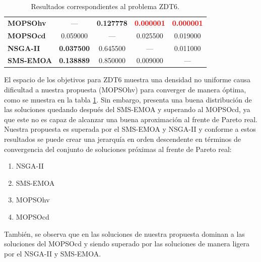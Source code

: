 \begin{table}
\begin{center}
\begin{tabular}{|l|cc|cc|}
	\textbf{MOPSOhv} &---       & \textbf{0.127778} & \textbf{\textcolor{red}{0.000001}}  & \textbf{\textcolor{red}{0.000001}} \\ 
	\textbf{MOPSOcd} & 0.059000 & ---      & 0.025500  & 0.019000  \\ 
	\textbf{NSGA-II} & \textbf{0.037500} & 0.645500 & ---       & 0.011000 \\  
	\textbf{SMS-EMOA}& \textbf{0.138889} & 0.850000 & 0.009000  & --- \\  
	\hline
	\end{tabular}
\caption{Resultados correspondientes al problema ZDT6.}
  \label{tab:zdt6}
\end{center}
\end{table}

El espacio de los objetivos para ZDT6 muestra una densidad no uniforme causa dificultad a nuestra propuesta (MOPSOhv) para converger de manera \'optima, 
como se muestra en la tabla \ref{tab:zdt6}. Sin embargo, presenta una buena distribuci\'on de las soluciones quedando despu\'es del SMS-EMOA y 
superando al MOPSOcd, ya que este no es capaz de alcanzar una buena aproximaci\'on al frente de Pareto real. Nuestra propuesta es superada 
por el SMS-EMOA y NSGA-II y conforme a estos resultados se puede crear una
jerarqu\'ia en orden descendente en t\'erminos de convergencia del conjunto de soluciones pr\'oximas al frente de Pareto real:

\begin{enumerate}
  \item NSGA-II
  \item SMS-EMOA
  \item MOPSOhv
  \item MOPSOcd
\end{enumerate}

Tambi\'en, se observa que en las soluciones de nuestra propuesta dominan a las soluciones del MOPSOcd y siendo superado por las soluciones
de manera ligera por el NSGA-II y SMS-EMOA.

\clearpage
\newpage

